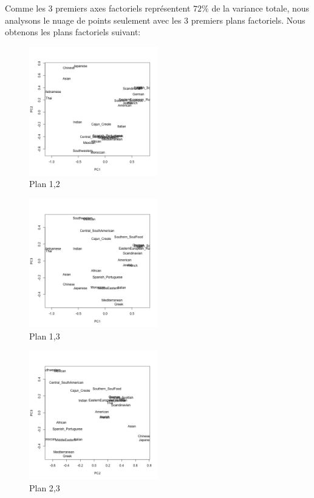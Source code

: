 \documentclass[a4paper,11pt,oneside,roman]{article}
\begin{document}
    Comme les 3 premiers axes factoriels représentent $72\%$ de la variance totale, nous analysons le nuage de points seulement avec les 3 premiers plans factoriels.
    Nous obtenons les plans factoriels suivant:
    \begin{figure}
        \centering
        \includegraphics[width=0.5\textwidth]{imgs/acp_plan_1_2.png}
        \caption{Plan 1,2}
        \label{fig_acp_plan_1_2}
    \end{figure}
    \begin{figure}
        \centering
        \includegraphics[width=0.5\textwidth]{imgs/acp_plan_1_3.png}
        \caption{Plan 1,3}
        \label{fig_acp_plan_1_3}
    \end{figure}
    \begin{figure}
        \centering
        \includegraphics[width=0.5\textwidth]{imgs/acp_plan_2_3.png}
        \caption{Plan 2,3}
        \label{fig_acp_plan_2_3}
    \end{figure}
    
\end{document}
